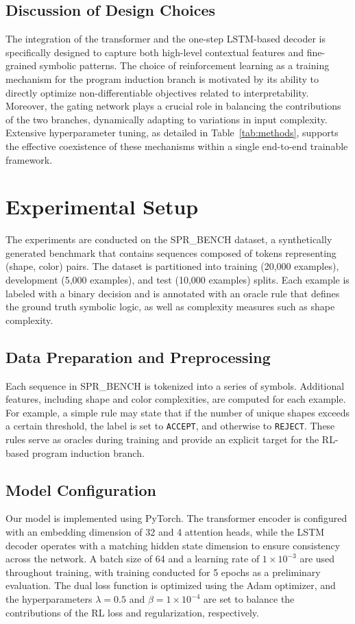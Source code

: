 \documentclass{article}
\begin{document}
\subsection{Discussion of Design Choices}
The integration of the transformer and the one-step LSTM-based decoder is specifically designed to capture both high-level contextual features and fine-grained symbolic patterns. The choice of reinforcement learning as a training mechanism for the program induction branch is motivated by its ability to directly optimize non-differentiable objectives related to interpretability. Moreover, the gating network plays a crucial role in balancing the contributions of the two branches, dynamically adapting to variations in input complexity. Extensive hyperparameter tuning, as detailed in Table~\ref{tab:methods}, supports the effective coexistence of these mechanisms within a single end-to-end trainable framework.

\section{Experimental Setup}
The experiments are conducted on the SPR\_BENCH dataset, a synthetically generated benchmark that contains sequences composed of tokens representing (shape, color) pairs. The dataset is partitioned into training (20,000 examples), development (5,000 examples), and test (10,000 examples) splits. Each example is labeled with a binary decision and is annotated with an oracle rule that defines the ground truth symbolic logic, as well as complexity measures such as shape complexity.

\subsection{Data Preparation and Preprocessing}
Each sequence in SPR\_BENCH is tokenized into a series of symbols. Additional features, including shape and color complexities, are computed for each example. For example, a simple rule may state that if the number of unique shapes exceeds a certain threshold, the label is set to \texttt{ACCEPT}, and otherwise to \texttt{REJECT}. These rules serve as oracles during training and provide an explicit target for the RL-based program induction branch.

\subsection{Model Configuration}
Our model is implemented using PyTorch. The transformer encoder is configured with an embedding dimension of 32 and 4 attention heads, while the LSTM decoder operates with a matching hidden state dimension to ensure consistency across the network. A batch size of 64 and a learning rate of \(1\times10^{-3}\) are used throughout training, with training conducted for 5 epochs as a preliminary evaluation. The dual loss function is optimized using the Adam optimizer, and the hyperparameters \(\lambda=0.5\) and \(\beta=1\times10^{-4}\) are set to balance the contributions of the RL loss and regularization, respectively.
\end{document}
